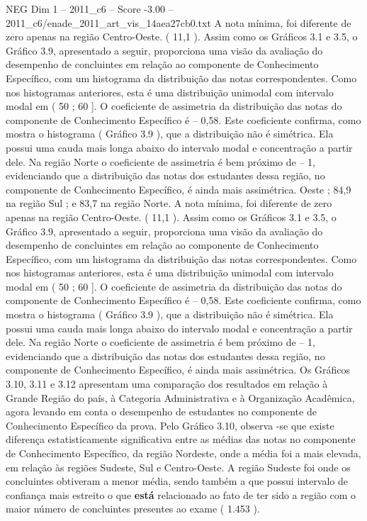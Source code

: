 \begin{textsample}{NEG Dim 1 – 2011\_c6 – Score -3.00 – 2011\_c6/enade\_2011\_art\_vis\_14aea27cb0.txt}
A nota mínima, foi diferente de zero apenas na região Centro-Oeste. ( 11,1 ).
Assim como os Gráficos 3.1 e 3.5, o Gráfico 3.9, apresentado a seguir, proporciona uma visão da avaliação do desempenho de concluintes em relação ao componente de Conhecimento Específico, com um histograma da distribuição das notas correspondentes.
Como nos histogramas anteriores, esta é uma distribuição unimodal com intervalo modal em ( 50 ; 60 ].
O coeficiente de assimetria da distribuição das notas do componente de Conhecimento Específico é – 0,58.
Este coeficiente confirma, como mostra o histograma ( Gráfico 3.9 ), que a distribuição não é simétrica.
Ela possui uma cauda mais longa abaixo do intervalo modal e concentração a partir dele.
Na região Norte o coeficiente de assimetria é bem próximo de – 1, evidenciando que a distribuição das notas dos estudantes dessa região, no componente de Conhecimento Específico, é ainda mais assimétrica.
Oeste ; 84,9 na região Sul ; e 83,7 na região Norte.
A nota mínima, foi diferente de zero apenas na região Centro-Oeste. ( 11,1 ).
Assim como os Gráficos 3.1 e 3.5, o Gráfico 3.9, apresentado a seguir, proporciona uma visão da avaliação do desempenho de concluintes em relação ao componente de Conhecimento Específico, com um histograma da distribuição das notas correspondentes.
Como nos histogramas anteriores, esta é uma distribuição unimodal com intervalo modal em ( 50 ; 60 ].
O coeficiente de assimetria da distribuição das notas do componente de Conhecimento Específico é – 0,58.
Este coeficiente confirma, como mostra o histograma ( Gráfico 3.9 ), que a distribuição não é simétrica.
Ela possui uma cauda mais longa abaixo do intervalo modal e concentração a partir dele.
Na região Norte o coeficiente de assimetria é bem próximo de – 1, evidenciando que a distribuição das notas dos estudantes dessa região, no componente de Conhecimento Específico, é ainda mais assimétrica.
Os Gráficos 3.10, 3.11 e 3.12 apresentam uma comparação dos resultados em relação à Grande Região do país, à Categoria Administrativa e à Organização Acadêmica, agora levando em conta o desempenho de estudantes no componente de Conhecimento Específico da prova.
Pelo Gráfico 3.10, observa -se que existe diferença estatisticamente significativa entre as médias das notas no componente de Conhecimento Específico, da região Nordeste, onde a média foi a mais elevada, em relação às regiões Sudeste, Sul e Centro-Oeste.
A região Sudeste foi onde os concluintes obtiveram a menor média, sendo também a que possui intervalo de confiança mais estreito o que \textbf{está} relacionado ao fato de ter sido a região com o maior número de concluintes presentes ao exame ( 1.453 ).

\end{textsample}
